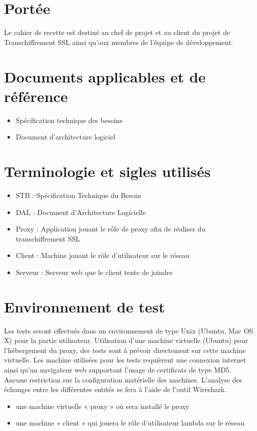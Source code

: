 \documentclass[a4paper,11pt,french]{article}
\begin{document}
\section{Portée}
Le cahier de recette est destiné au chef de projet et au client du projet de
Transchiffrement SSL ainsi qu’aux membres de l’équipe de développement.


\section{Documents applicables et de référence}

\begin{itemize}
  \item Spécification technique des besoins
  \item Document d'architecture logiciel
\end{itemize}

\section{Terminologie et sigles utilisés}

\begin{itemize}
  \item STB : Spécification Technique du Besoin
  \item DAL : Document d’Architecture Logicielle
  \item Proxy : Application jouant le rôle de proxy afin de réaliser du transchiffrement SSL
  \item Client : Machine jouant le rôle d'utilisateur sur le réseau
  \item Serveur : Serveur web que le client tente de joindre
\end{itemize}

\section{Environnement de test}
Les tests seront effectués dans un environnement de type Unix (Ubuntu, Mac OS 
X) pour la partie utilisateur. Utilisation d'une machine virtuelle (Ubuntu) pour l'hébergement du 
proxy, des tests sont à prévoir directement sur cette machine virtuelle. Les 
machine utilisées pour les tests requièrent une connexion internet ainsi qu'un
navigateur web supportant l'usage de certificats de type MD5. Aucune restriction 
sur la configuration matérielle des machines.
L'analyse des échanges entre les différentes entités se fera à l'aide de 
l'outil Wireshark.
\begin{itemize}
\item une machine virtuelle « proxy » où sera installé le proxy 
\item une machine « client » qui jouera le rôle d'utilisateur lambda sur le réseau
\end{itemize}
\end{document}
